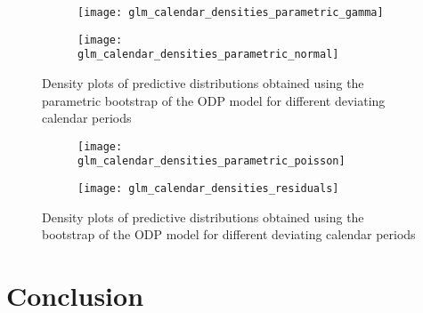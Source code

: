 \documentclass[a4paper]{book}
\begin{document}
\begin{landscape}
  \begin{figure}
    \begin{subfigure}{0.5\linewidth}
      \centering
      \texttt{[image: glm\_calendar\_densities\_parametric\_gamma]}
      \label{fig:odp-calendar-param-gamma}
    \end{subfigure}
    \begin{subfigure}{0.5\linewidth}
      \centering
      \texttt{[image: glm\_calendar\_densities\_parametric\_normal]}
      \label{fig:odp-calendar-param-norm}
    \end{subfigure}
    \caption{Density plots of predictive distributions obtained using the parametric bootstrap of the ODP model for different deviating calendar periods}
  \end{figure}
\end{landscape}

\begin{landscape}
  \begin{figure}
    \begin{subfigure}{0.5\linewidth}
      \centering
      \texttt{[image: glm\_calendar\_densities\_parametric\_poisson]}
      \label{fig:odp-calendar-param-pois}
    \end{subfigure}
    \begin{subfigure}{0.5\linewidth}
      \centering
      \texttt{[image: glm\_calendar\_densities\_residuals]}
      \label{fig:odp-calendar-semiparam}
    \end{subfigure}
    \caption{Density plots of predictive distributions obtained using the bootstrap of the ODP model for different deviating calendar periods}
  \end{figure}
\end{landscape}

\restoregeometry

\backmatter%

\chapter{Conclusion} \label{conclusion}
\end{document}
